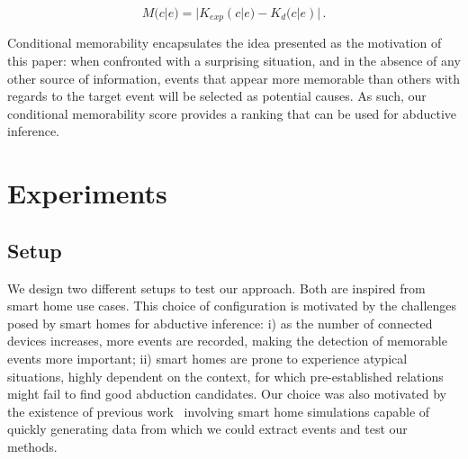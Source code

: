 \documentclass[entropy,article,submit,moreauthors,pdftex]{Definitions/mdpi}
\begin{document}
\begin{equation}
    \label{eq:cond_mem}
    M(c|e) = |K_{exp}(c|e) - K_d(c|e)|\,.
\end{equation}

Conditional memorability encapsulates the idea
presented as the motivation of this paper: when confronted with a surprising
situation, and in the absence of any other source of information, events that appear more memorable than others with regards to the target event will be selected as potential causes. As such, our conditional memorability score provides a ranking that can be used for abductive inference.



\section{Experiments}
\label{sec:results}
\subsection{Setup}
\label{sec:setup}

We design two different setups to test our approach. Both are inspired from smart home use cases.  This choice of
configuration is motivated by the challenges posed by smart homes for abductive
inference: i) as the number of connected devices increases, more events are
recorded, making the detection of memorable events more important; ii) smart
homes are prone to experience atypical situations, highly dependent on the context,
for which pre-established relations might fail to find good abduction
candidates. Our choice was also motivated by
the existence of previous work~\cite{lalanda_self-aware_2017} involving smart home simulations capable of quickly generating data from which we could extract events and test our methods.

\end{document}
